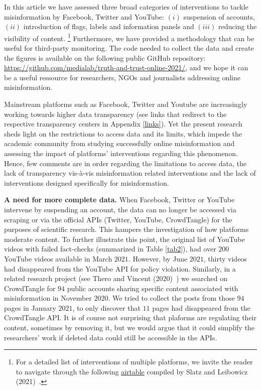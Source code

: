 \documentclass{article}
\begin{document}
In this article we have assessed three broad categories of interventions to tackle misinformation by Facebook, Twitter and YouTube: $(i)$ suspension of accounts, $(ii)$ introduction of flags, labels and information panels and $(iii)$ reducing the visibility of content.
\footnote{For a detailed list of interventions of multiple platforms, we invite the reader to navigate through the following \href{https://airtable.com/shrO0ooI9WSEfIUhb/tblAWQwFOiihKdQjm/viwZLAOzLK1NQ0c2n?blocks=hide}{airtable} compiled by Slatz and Leibowicz (2021)~\cite{niemanlab}.}
Furthermore, we have provided a methodology that can be useful for third-party monitoring. 
The code needed to collect the data and create the figures is available on the following public GitHub repository: \href{https://github.com/medialab/truth-and-trust-online-2021/}{https://github.com/medialab/truth-and-trust-online-2021/}, and we hope it can be a useful ressource for researchers, NGOs and journalists addressing online misinformation. 

\smallskip

Mainstream platforms such as Facebook, Twitter and Youtube are increasingly working towards higher data transparency (see links that redirect to the respective transparency centers in Appendix \ref{links}). 
Yet the present research sheds light on the restrictions to access data and its limits, which impede the academic community from studying successfully online misinformation and assessing the impact of platforms' interventions regarding this phenomenon. 
Hence, few comments are in order regarding the limitations to access data, the lack of transparency vis-\`{a}-vis misinformation related interventions and the lack of interventions designed specifically for misinformation. 

\smallskip

{\bf A need for more complete data.} 
When Facebook, Twitter or YouTube intervene by suspending an account, the data can no longer be accessed via scraping or via the official APIs (Twitter, YouTube, CrowdTangle) for the purposes of scientific research. 
This hampers the investigation of how platforms moderate content. 
To further illustrate this point, the original list of YouTube videos with failed fact-checks (summarized in Table \ref{tab2}), had over $200$ YouTube videos available in March $2021$. 
However, by June $2021$, thirty videos had disappeared from the YouTube API for policy violation. 
Similarly, in a related research project (see Thero and Vincent (2020)~\cite{therovincent}) we searched on CrowdTangle for $94$ public accounts sharing specific content associated with misinformation in November $2020$. 
We tried to collect the posts from those $94$ pages in January $2021$, to only discover that $11$ pages had disappeared from the CrowdTangle API.
It is of course not surprising that plaforms are regulating their content, sometimes by removing it, but we would argue that it could simplify the researchers' work if deleted data could still be accessible in the APIs.
\end{document}
